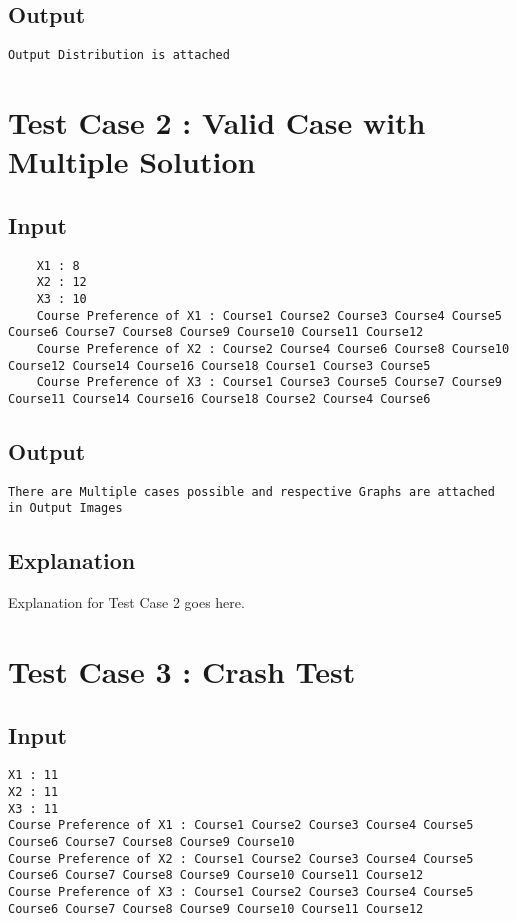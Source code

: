 \documentclass{article}
\begin{document}
\subsection*{Output}
\begin{verbatim}
Output Distribution is attached 
\end{verbatim}


\section*{Test Case 2 : Valid Case with Multiple Solution}

\subsection*{Input}
\begin{verbatim}
    X1 : 8
    X2 : 12
    X3 : 10
    Course Preference of X1 : Course1 Course2 Course3 Course4 Course5 Course6 Course7 Course8 Course9 Course10 Course11 Course12
    Course Preference of X2 : Course2 Course4 Course6 Course8 Course10 Course12 Course14 Course16 Course18 Course1 Course3 Course5
    Course Preference of X3 : Course1 Course3 Course5 Course7 Course9 Course11 Course14 Course16 Course18 Course2 Course4 Course6
\end{verbatim}

\subsection*{Output}
\begin{verbatim}
There are Multiple cases possible and respective Graphs are attached in Output Images
\end{verbatim}

\subsection*{Explanation}
Explanation for Test Case 2 goes here.

\section*{Test Case 3 : Crash Test}

\subsection*{Input}
\begin{verbatim}
X1 : 11
X2 : 11
X3 : 11
Course Preference of X1 : Course1 Course2 Course3 Course4 Course5 Course6 Course7 Course8 Course9 Course10
Course Preference of X2 : Course1 Course2 Course3 Course4 Course5 Course6 Course7 Course8 Course9 Course10 Course11 Course12
Course Preference of X3 : Course1 Course2 Course3 Course4 Course5 Course6 Course7 Course8 Course9 Course10 Course11 Course12
\end{verbatim}
\end{document}
